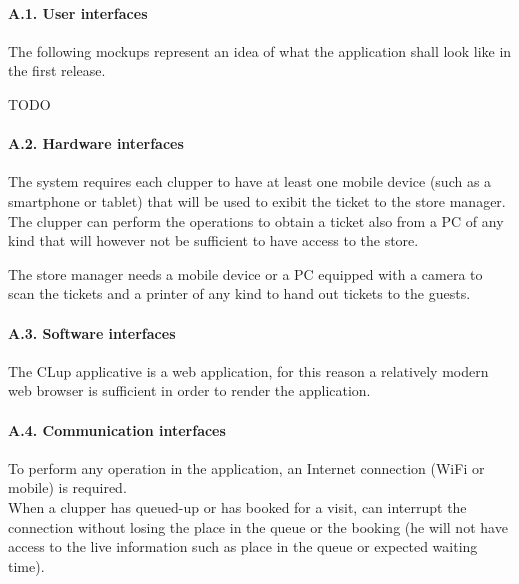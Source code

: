 \documentclass[
]{article}
\begin{document}
\hypertarget{a.1.-user-interfaces}{%
\paragraph{A.1. User interfaces}\label{a.1.-user-interfaces}}

The following mockups represent an idea of what the application shall
look like in the first release.

TODO

\hypertarget{a.2.-hardware-interfaces}{%
\paragraph{A.2. Hardware interfaces}\label{a.2.-hardware-interfaces}}

The system requires each clupper to have at least one mobile device
(such as a smartphone or tablet) that will be used to exibit the ticket
to the store manager.\\
The clupper can perform the operations to obtain a ticket also from a PC
of any kind that will however not be sufficient to have access to the
store.

The store manager needs a mobile device or a PC equipped with a camera
to scan the tickets and a printer of any kind to hand out tickets to the
guests.

\hypertarget{a.3.-software-interfaces}{%
\paragraph{A.3. Software interfaces}\label{a.3.-software-interfaces}}

The CLup applicative is a web application, for this reason a relatively
modern web browser is sufficient in order to render the application.

\hypertarget{a.4.-communication-interfaces}{%
\paragraph{A.4. Communication
interfaces}\label{a.4.-communication-interfaces}}

To perform any operation in the application, an Internet connection
(WiFi or mobile) is required.\\
When a clupper has queued-up or has booked for a visit, can interrupt
the connection without losing the place in the queue or the booking (he
will not have access to the live information such as place in the queue
or expected waiting time).
\end{document}
